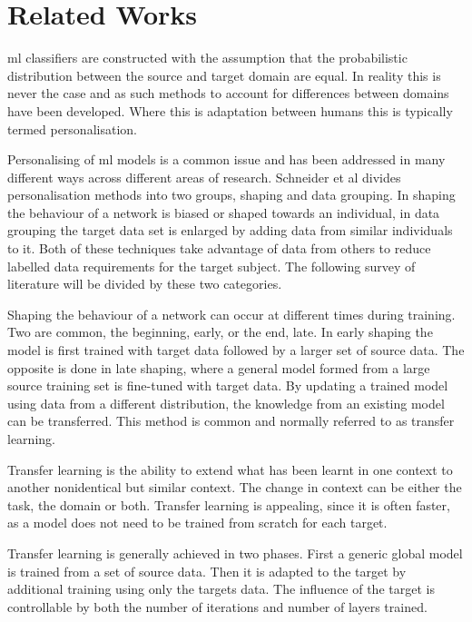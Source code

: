 \section{Related Works} %
\label{sec:personalisation-related-works}
\acrshort{ml} classifiers are constructed with the assumption that the probabilistic distribution between the source and target domain are equal\cite{Farahani2020}. In reality this is never the case and as such methods to account for differences between domains have been developed. Where this is adaptation between humans this is typically termed personalisation.

Personalising of \acrshort{ml} models is a common issue and has been addressed in many different ways across different areas of research\cite{Mairittha2021, Tomanek2021}. Schneider et al divides personalisation methods into two groups, shaping and data grouping\cite{Schneider2021}. In shaping the behaviour of a network is biased or shaped towards an individual, in data grouping the target data set is enlarged by adding data from similar individuals to it. Both of these techniques take advantage of data from others to reduce labelled data requirements for the target subject\cite{Shor2020}. The following survey of literature will be divided by these two categories. 

Shaping the behaviour of a network can occur at different times during training. Two are common, the beginning, early, or the end, late. In early shaping the model is first trained with target data followed by a larger set of source data. The opposite is done in late shaping, where a general model formed from a large source training set is fine-tuned with target data. By updating a trained model using data from a different distribution, the knowledge from an existing model can be transferred. This method is common and normally referred to as transfer learning.\cite{Schneider2021}

Transfer learning is the ability to extend what has been learnt in one context to another nonidentical but similar context\cite{Fallahzadeh2017}. The change in context can be either the task, the domain or both. Transfer learning is appealing, since it is often faster, as a model does not need to be trained from scratch for each target. 

Transfer learning is generally achieved in two phases. First a generic global model is trained from a set of source data. Then it is adapted to the target by additional training using only the targets data. The influence of the target is controllable by both the number of iterations and number of layers trained.\cite{Schneider2021, Mireshghallah2021}


